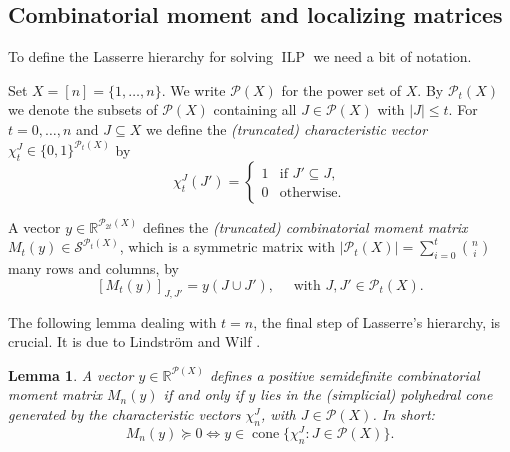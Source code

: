 \documentclass{amsart}
\newtheorem{lemma}[defin]{Lemma}
\newcommand{\R}{\mathbb{R}}
\DeclareMathOperator{\ILP}{ILP}
\DeclareMathOperator{\cone}{cone}
\begin{document}
%

\subsection{Combinatorial moment and localizing matrices}

To define the Lasserre hierarchy for solving $\ILP$ we need a bit of
notation.

Set $X = [n] = \{1, \ldots, n\}$. We write $\mathcal{P}(X)$ for the
power set of $X$.  By $\mathcal{P}_t(X)$ we denote the subsets of
$\mathcal{P}(X)$ containing all $J \in \mathcal{P}(X)$ with
$|J| \leq t$. For $t = 0, \ldots, n$ and $J \subseteq X$ we define the
\emph{(truncated) characteristic vector}
$\chi^J_t \in \{0,1\}^{\mathcal{P}_t(X)}$ by
\[
  \chi^J_t(J') =
  \begin{cases}
    1 & \text{if $J' \subseteq J$,}\\
    0 & \text{otherwise.}
    \end{cases}
\]

A vector $y \in \R^{\mathcal{P}_{2t}(X)}$ defines the
\emph{(truncated) combinatorial moment matrix}
$M_t(y) \in \mathcal{S}^{\mathcal{P}_t(X)}$, which is a symmetric
matrix with $|\mathcal{P}_t(X)| = \sum_{i=0}^t \binom{n}{i}$ many rows and columns, by
\[
[M_t(y)]_{J,J'} = y(J \cup J'), \quad \text{ with } J, J' \in \mathcal{P}_t(X).
\]

The following lemma dealing with $t = n$, the final step of Lasserre's
hierarchy, is crucial. It is due to Lindstr\"om \cite{Lindstroem-1969}
and Wilf \cite{Wilf-1968}.

\begin{lemma}
  \label{lem:crucial-lemma}
  A vector $y \in \R^{\mathcal{P}(X)}$ defines a positive semidefinite
  combinatorial moment matrix $M_n(y)$ if and only if $y$ lies in the
  (simplicial) polyhedral cone generated by the characteristic vectors
  $\chi^J_n$, with $J \in \mathcal{P}(X)$. In short:
  \[
    M_n(y) \succeq 0 \Longleftrightarrow y \in \cone\{\chi^J_n : J \in
    \mathcal{P}(X)\}.
  \]
\end{lemma}
\end{document}
